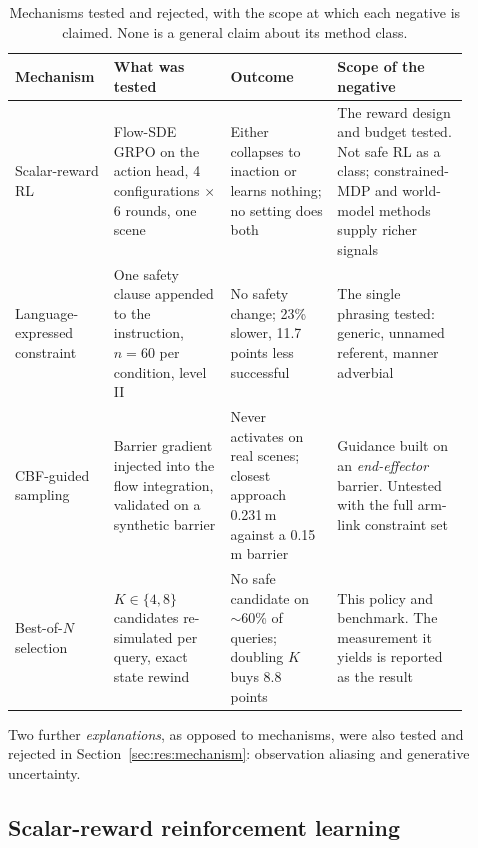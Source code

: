 \begin{table}[htbp]
\centering
\begin{threeparttable}
\caption[Mechanisms tested and rejected]{%
  Mechanisms tested and rejected, with the scope at which each negative is claimed. None is a
  general claim about its method class.}
\label{tab:negatives}
\footnotesize
\begin{tabular}{p{0.17\linewidth}p{0.24\linewidth}p{0.22\linewidth}p{0.27\linewidth}}
\toprule
\textbf{Mechanism} & \textbf{What was tested} & \textbf{Outcome} & \textbf{Scope of the negative} \\
\midrule
Scalar-reward RL
  & Flow-SDE GRPO on the action head, 4 configurations $\times$ 6 rounds, one scene
  & Either collapses to inaction or learns nothing; no setting does both
  & The reward design and budget tested. Not safe RL as a class; constrained-MDP and
    world-model methods supply richer signals \\
\addlinespace[3pt]
Language-expressed constraint
  & One safety clause appended to the instruction, $n=60$ per condition, level II
  & No safety change; 23\% slower, 11.7 points less successful
  & The single phrasing tested: generic, unnamed referent, manner adverbial \\
\addlinespace[3pt]
CBF-guided sampling
  & Barrier gradient injected into the flow integration, validated on a synthetic barrier
  & Never activates on real scenes; closest approach 0.231\,m against a 0.15\,m barrier
  & Guidance built on an \emph{end-effector} barrier. Untested with the full arm-link
    constraint set \\
\addlinespace[3pt]
Best-of-$N$ selection
  & $K \in \{4, 8\}$ candidates re-simulated per query, exact state rewind
  & No safe candidate on $\sim$60\% of queries; doubling $K$ buys 8.8 points
  & This policy and benchmark. The measurement it yields is reported as the result \\
\bottomrule
\end{tabular}
\begin{tablenotes}[flushleft]\footnotesize
\item Two further \emph{explanations}, as opposed to mechanisms, were also tested and rejected in
  Section~\ref{sec:res:mechanism}: observation aliasing and generative uncertainty.
\end{tablenotes}
\end{threeparttable}
\end{table}

\subsection*{Scalar-reward reinforcement learning}

